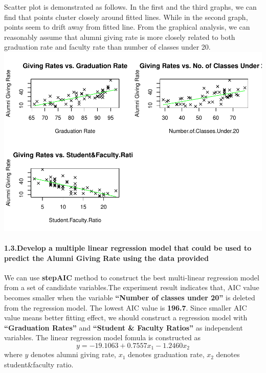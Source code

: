 \documentclass[]{article}
\let\oldparagraph\paragraph
\renewcommand{\paragraph}[1]{\oldparagraph{#1}\mbox{}}
\begin{document}
Scatter plot is demonstrated as follows. In the first and the third
graphs, we can find that points cluster closely around fitted lines.
While in the second graph, points seem to drift away from fitted line.
From the graphical analysis, we can reasonably assume that alumni giving
rate is more closely related to both graduation rate and faculty rate
than number of classes under 20.
\includegraphics{Assign3_Rmarkdown备份_files/figure-latex/unnamed-chunk-1-1.pdf}

\hypertarget{develop-a-multiple-linear-regression-model-that-could-be-used-to-predict-the-alumni-giving-rate-using-the-data-provided}{%
\paragraph{\texorpdfstring{\textbf{1.3.Develop a multiple linear
regression model that could be used to predict the Alumni Giving Rate
using the data
provided}}{1.3.Develop a multiple linear regression model that could be used to predict the Alumni Giving Rate using the data provided}}\label{develop-a-multiple-linear-regression-model-that-could-be-used-to-predict-the-alumni-giving-rate-using-the-data-provided}}

We can use \textbf{stepAIC} method to construct the best multi-linear
regression model from a set of candidate variables.The experiment result
indicates that, AIC value becomes smaller when the variable
\textbf{``Number of classes under 20''} is deleted from the regression
model. The lowest AIC value is \textbf{196.7}. Since smaller AIC value
means better fitting effect, we should construct a regression model with
\textbf{``Graduation Rates''} and \textbf{``Student \& Faculty Ratios''}
as independent variables. The linear regression model fomula is
constructed as \[y=-19.1063+0.7557x_{1}-1.2460x_{2}\]where \(y\) denotes
alumni giving rate, \(x_{1}\) denotes graduation rate, \(x_{2}\) denotes
student\&faculty ratio.
\end{document}
